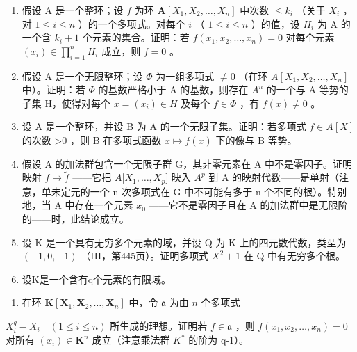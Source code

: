\BourbakiExerciseGroup

\begin{enumerate}
\def\labelenumi{\arabic{enumi})}
\item
  假设 A 是一个整环；设 \(f\) 为环 \(\mathbf{A}[X_1, X_2, \ldots, X_n]\) 中次数 \(\leqslant k_i\) （关于 \(X_i\) ，对 \(1 \leqslant i \leqslant n\) ）的一个多项式。对每个 \(i\) （ \(1 \leqslant i \leqslant n\) ）的值，设 \(H_i\) 为 A 的一个含 \(k_i + 1\) 个元素的集合。证明：若 \(f(x_1, x_2, \ldots, x_n) = 0\) 对每个元素 \((x_i) \in \prod_{i=1}^{n} H_i\) 成立，则 \(f = 0\) 。
\item
  假设 A 是一个无限整环；设 \(\Phi\) 为一组多项式 \(\neq0\) （在环 \(A[X_{1},X_{2},\ldots,X_{n}]\) 中）。证明：若 \(\Phi\) 的基数严格小于 A 的基数，则存在 \(A^{n}\) 的一个与 A 等势的子集 H，使得对每个 \(x=(x_{i})\in H\) 及每个 \(f\in\Phi\) ，有 \(f(x)\neq0\) 。
\item
  设 A 是一个整环，并设 B 为 A 的一个无限子集。证明：若多项式 \(f \in A[X]\) 的次数 \textgreater0 ，则 B 在多项式函数 \(x \mapsto f(x)\) 下的像与 B 等势。
\item
  假设 A 的加法群包含一个无限子群 G，其非零元素在 A 中不是零因子。证明映射 \(f \mapsto \tilde{f}\) ——它把 \(A{[}X_{1}, \ldots, X_{p}{]}\) 映入 \(A^{p}\) 到 A 的映射代数——是单射（注意，单未定元的一个 n 次多项式在 G 中不可能有多于 n 个不同的根）。特别地，当 A 中存在一个元素 \(x_{0}\) ——它不是零因子且在 A 的加法群中是无限阶的——时，此结论成立。
\item
  设 K 是一个具有无穷多个元素的域，并设 Q 为 K 上的四元数代数，类型为 \((-1,0,-1)\) （III，第445页）。证明多项式 \(X^{2}+1\) 在 Q 中有无穷多个根。
\item
  设K是一个含有q个元素的有限域。
\end{enumerate}

\begin{enumerate}
\def\labelenumi{\alph{enumi})}
\tightlist
\item
  在环 \(\mathbf{K}[\mathbf{X}_1, \mathbf{X}_2, \ldots, \mathbf{X}_n]\) 中，令 \(\mathfrak{a}\) 为由 \(n\) 个多项式
\end{enumerate}

\(X_{i}^{q}-X_{i}\quad(1\leqslant i\leqslant n)\) 所生成的理想。证明若 \(f\in\mathfrak{a}\) ，则 \(f(x_{1},x_{2},\ldots,x_{n})=0\) 对所有 \((x_{i})\in\mathbf{K}^{n}\) 成立（注意乘法群 \(K^{*}\) 的阶为 q-1）。

